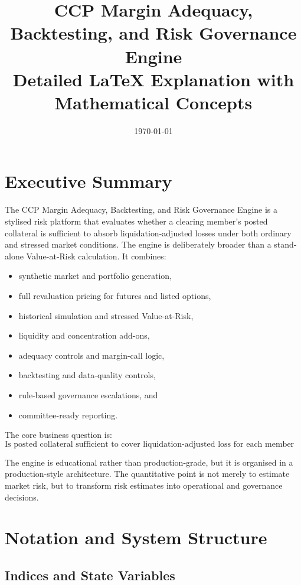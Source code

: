 \documentclass[11pt]{article}
\title{CCP Margin Adequacy, Backtesting, and Risk Governance Engine\\
\large Detailed LaTeX Explanation with Mathematical Concepts}
\author{}
\date{\today}
\begin{document}
\maketitle
\tableofcontents
\newpage

\section{Executive Summary}

The CCP Margin Adequacy, Backtesting, and Risk Governance Engine is a stylised risk platform that evaluates whether a clearing member's posted collateral is sufficient to absorb liquidation-adjusted losses under both ordinary and stressed market conditions. The engine is deliberately broader than a stand-alone Value-at-Risk calculation. It combines:

\begin{itemize}
    \item synthetic market and portfolio generation,
    \item full revaluation pricing for futures and listed options,
    \item historical simulation and stressed Value-at-Risk,
    \item liquidity and concentration add-ons,
    \item adequacy controls and margin-call logic,
    \item backtesting and data-quality controls,
    \item rule-based governance escalations, and
    \item committee-ready reporting.
\end{itemize}

The core business question is:
\[
\text{Is posted collateral sufficient to cover liquidation-adjusted loss for each member on each day?}
\]

The engine is educational rather than production-grade, but it is organised in a production-style architecture. The quantitative point is not merely to estimate market risk, but to transform risk estimates into operational and governance decisions.

\section{Notation and System Structure}

\subsection{Indices and State Variables}
\end{document}
